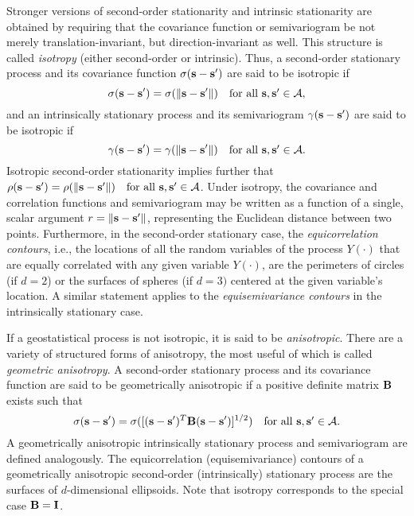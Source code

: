 Stronger versions of second-order stationarity and intrinsic stationarity are obtained by requiring that the covariance function or semivariogram be not merely translation-invariant, but direction-invariant as well.  This structure is called {\em isotropy} (either second-order or intrinsic).  Thus, a second-order stationary process and its covariance function $\sigma({\bf s}-{\bf s}')$ are said to be isotropic if
\begin{equation}\label{isotropic1}
\sigma({\bf s}-{\bf s}') = \sigma(\|{\bf s}-{\bf s}'\|)\quad\mbox{for all ${\bf s},{\bf s}'\in{\cal A}$},
\end{equation}
and an intrinsically stationary process and its semivariogram $\gamma({\bf s}-{\bf s}')$ are said to be isotropic if
\begin{equation}\label{isotropic2}
\gamma({\bf s}-{\bf s}') = \gamma(\|{\bf s}-{\bf s}'\|)\quad\mbox{for all ${\bf s},{\bf s}'\in{\cal A}$}.
\end{equation}
Isotropic second-order stationarity implies further that $\rho({\bf s}-{\bf s}')=\rho(\|{\bf s}-{\bf s}'\|) \quad\mbox{for all ${\bf s},{\bf s}'\in{\cal A}$}$.  Under isotropy, the covariance and correlation functions and semivariogram may be written as a function of a single, scalar argument $r=\|{\bf s}-{\bf s}'\|$, representing the Euclidean distance between two points.  Furthermore, in the second-order stationary case, the {\em equicorrelation contours}, i.e., the locations of all the random variables of the process $Y(\cdot)$ that are equally correlated with any given variable $Y(\cdot)$, are the perimeters of circles (if $d=2$) or the surfaces of spheres (if $d=3)$ centered at the given variable's location.  A similar statement applies to the {\em equisemivariance contours} in the intrinsically stationary case.

If a geostatistical process is not isotropic, it is said to be {\em anisotropic}.  There are a variety of structured forms of anisotropy, the most useful of which is called {\em geometric anisotropy}. 
A second-order stationary process and its covariance function are said to be geometrically 
anisotropic if a positive definite matrix ${\bf B}$ exists such that
\[ \sigma({\bf s}-{\bf s}')=\sigma([({\bf s}-{\bf s}')^T{\bf B}({\bf s}-{\bf s}')]^{1/2}) \quad\mbox{for all ${\bf s},{\bf s}'\in{\cal A}$}. \]
A geometrically anisotropic intrinsically stationary process and semivariogram are defined analogously.
The equicorrelation (equisemivariance) contours of a geometrically anisotropic second-order (intrinsically) stationary process are the surfaces of $d$-dimensional ellipsoids.  Note that isotropy corresponds to the special case ${\bf B}={\bf I}$.

